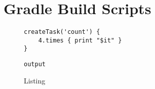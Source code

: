 \chapter{Gradle Build Scripts}



\begin{figure}
\caption{Listing}
\begin{Verbatim}[frame=topline, framesep=3mm]
createTask('count') {
    4.times { print "$it" }
}
\end{Verbatim}
\begin{Verbatim}[frame=single, framesep=1mm, framerule=1mm]
output
\end{Verbatim}
\end{figure}

